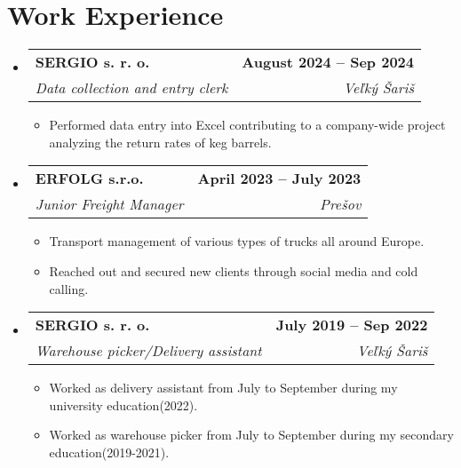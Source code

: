 \documentclass[letterpaper,11pt]{article}
\makeatletter
\newcommand{\resumeItem}[1]{
  \item\small{
    {#1 \vspace{0pt}}
  }
}
\newcommand{\resumeSubheading}[4]{
  \vspace{-2pt}\item
    \begin{tabular*}{1.0\textwidth}[t]{l@{\extracolsep{\fill}}r}
      \textbf{#1} & \textbf{\small #2} \\
      \textit{\small#3} & \textit{\small #4} \\
    \end{tabular*}\vspace{-7pt}
}
\newcommand{\resumeSubHeadingListStart}{\begin{itemize}[leftmargin=0.0in, label={}]}
\newcommand{\resumeSubHeadingListEnd}{\end{itemize}}\vspace{0pt}
\newcommand{\resumeItemListStart}{\begin{itemize}}
\newcommand{\resumeItemListEnd}{\end{itemize}\vspace{-5pt}}
\makeatother
\begin{document}
\section{Work Experience}
    \resumeSubHeadingListStart
                \resumeSubheading{SERGIO s. r. o.}{August 2024 -- Sep 2024}{Data collection and entry clerk}{Veľký Šariš} 
                \resumeItemListStart
                    \resumeItem{Performed data entry into Excel contributing to a company-wide project analyzing the return rates of keg barrels.}
                    \resumeItemListEnd
            \resumeSubheading{ERFOLG s.r.o.}{April 2023 -- July 2023}{Junior Freight Manager}{Prešov} 
                \resumeItemListStart
                    \resumeItem{Transport management of various types of trucks all around Europe.}
		\resumeItem{Reached out and secured new clients through social media and cold calling.}
	       \resumeItemListEnd
            \resumeSubheading{SERGIO s. r. o.}{July 2019 -- Sep 2022}{Warehouse picker/Delivery assistant}{Veľký Šariš}
                \resumeItemListStart
	\resumeItem{Worked as delivery assistant from July to September during my university education(2022).}                    
	\resumeItem{Worked as warehouse picker from July to September during my secondary education(2019-2021).}         
                    \resumeItemListEnd
    \resumeSubHeadingListEnd
    \vspace{-12pt}

\end{document}
